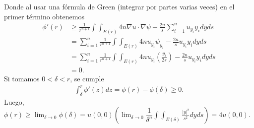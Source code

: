 \begin{homeworkProblem}
\begin{solucion}
    Donde al usar una fórmula de Green (integrar por partes varias veces) en el primer término obtenemos
    \begin{align*}
      \phi ' (r) &\geq \frac{1}{r^{n+1}} \int \int_{E(r)} 4n \nabla u \cdot \nabla \psi - \frac{2n}{s} \displaystyle \sum_{i=1}^{n} u_{y_{i}}y_{i} dyds\\ 
                 &=\displaystyle \sum_{i=1}^{n} \frac{1}{r^{n+1}} \int \int_{E(r)} 4n u_{y_{i}} \psi_{y_{i}} - \frac{2n}{s} u_{y_{i}}y_{i} dyds\\ 
                 &= \displaystyle \sum_{i=1}^{n} \frac{1}{r^{n+1}} \int \int_{E(r)} 4n u_{y_{i}} \left( \frac{y_{i}}{2s}\right) - \frac{2n}{s} u_{y_{i}}y_{i} dyds\\ 
                 &=0.
    \end{align*} 
    Si tomamos $0< \delta < r$, se cumple
    \begin{align*}
      \int_{\delta}^{r} \phi '(z) dz = \phi(r) - \phi(\delta) \geq 0.
    \end{align*}
    Luego, $\phi(r) \geq \lim_{\delta \rightarrow 0} \phi(\delta) = u(0,0) \left(\lim_{\delta \rightarrow 0} \dfrac{1}{\delta ^{n}} \displaystyle \int \displaystyle \int_{E(\delta)} \frac{|y|^{2}}{s^{2}} dyds\right) = 4 u(0,0)$.
    \demostrado
  \end{solucion}  
\end{homeworkProblem}
